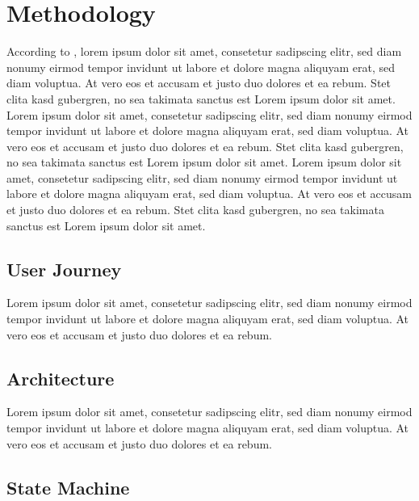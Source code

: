 \section{Methodology} \label{sec:methodology}
According to \cite{sample_ref}, lorem ipsum dolor sit amet, consetetur sadipscing elitr, sed diam nonumy eirmod tempor invidunt ut labore et dolore magna aliquyam erat, sed diam voluptua. At vero eos et accusam et justo duo dolores et ea rebum. Stet clita kasd gubergren, no sea takimata sanctus est Lorem ipsum dolor sit amet. Lorem ipsum dolor sit amet, consetetur sadipscing elitr, sed diam nonumy eirmod tempor invidunt ut labore et dolore magna aliquyam erat, sed diam voluptua. At vero eos et accusam et justo duo dolores et ea rebum. Stet clita kasd gubergren, no sea takimata sanctus est Lorem ipsum dolor sit amet. Lorem ipsum dolor sit amet, consetetur sadipscing elitr, sed diam nonumy eirmod tempor invidunt ut labore et dolore magna aliquyam erat, sed diam voluptua. At vero eos et accusam et justo duo dolores et ea rebum. Stet clita kasd gubergren, no sea takimata sanctus est Lorem ipsum dolor sit amet.

\subsection{User Journey}
Lorem ipsum dolor sit amet, consetetur sadipscing elitr, sed diam nonumy eirmod tempor invidunt ut labore et dolore magna aliquyam erat, sed diam voluptua. At vero eos et accusam et justo duo dolores et ea rebum.

\subsection{Architecture}
Lorem ipsum dolor sit amet, consetetur sadipscing elitr, sed diam nonumy eirmod tempor invidunt ut labore et dolore magna aliquyam erat, sed diam voluptua. At vero eos et accusam et justo duo dolores et ea rebum.

\subsection{State Machine}

